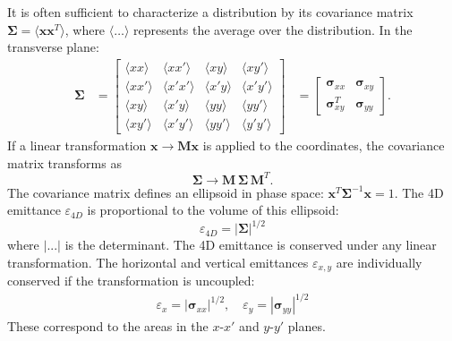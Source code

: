 It is often sufficient to characterize a distribution by its covariance matrix {$\bm{\Sigma} = \langle{\mathbf{x}\mathbf{x}^T}\rangle$}, where $\langle{\dots}\rangle$ represents the average over the distribution. In the transverse plane:
%
\begin{equation}\label{eq:covariance_matrix}
\begin{aligned}
    \bm{\Sigma} &= 
    \begin{bmatrix}
        \langle{xx}\rangle & \langle{xx'}\rangle & \langle{xy}\rangle & \langle{xy'}\rangle \\
        \langle{xx'}\rangle & \langle{x'x'}\rangle & \langle{x'y}\rangle & \langle{x'y'}\rangle \\
        \langle{xy}\rangle & \langle{x'y}\rangle & \langle{yy}\rangle & \langle{yy'}\rangle \\
        \langle{xy'}\rangle & \langle{x'y'}\rangle & \langle{yy'}\rangle & \langle{y'y'}\rangle 
    \end{bmatrix}
    &= 
    \begin{bmatrix}
        \bm{\sigma}_{xx} & \bm{\sigma}_{xy} \\
        \bm{\sigma}^T_{xy} & \bm{\sigma}_{yy}
    \end{bmatrix}.
\end{aligned}
\end{equation}
%
If a linear transformation $\mathbf{x} \rightarrow \mathbf{M}\mathbf{x}$ is applied to the coordinates, the covariance matrix transforms as
%
\begin{equation}\label{covariance_matrix_transport}
    \bm{\Sigma} 
    \rightarrow 
    \mathbf{M} \, \bm{\Sigma} \, \mathbf{M}^T.
\end{equation}
%
The covariance matrix defines an ellipsoid in phase space: $\mathbf{x}^T \bm{\Sigma}^{-1} \mathbf{x} = 1$. The 4D emittance $\varepsilon_{4D}$ is proportional to the volume of this ellipsoid:
%
\begin{equation} 
    \varepsilon_{4D} = \left|{\bm{\Sigma}}\right|^{1/2}
\end{equation}
%
where $|...|$ is the determinant. The 4D emittance is conserved under any linear transformation. The horizontal and vertical emittances $\varepsilon_{x,y}$ are individually conserved if the transformation is uncoupled:
%
\begin{equation}
\begin{aligned}
    \varepsilon_x = \left|{\bm\sigma}_{xx}\right|^{1/2}, \quad
    \varepsilon_y = \left|{\bm\sigma}_{yy}\right|^{1/2}
\end{aligned}
\end{equation}
%
These correspond to the areas in the $x$-$x'$ and $y$-$y'$ planes. 


